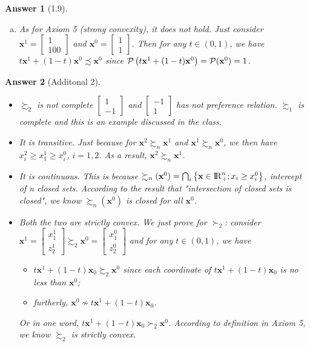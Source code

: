 \documentclass{article}
\newtheorem*{ans}{Answer}
\newcommand {\Reals}  {{\rm I \! R}}
\newcommand{\1}{{\bf 1}}
\newcommand{\0}{{\mathbf{0}}}
\newcommand{\x}{{\mathbf{x}}}
\newcommand{\cP}{{\cal P}}
\newcommand{\<}{\langle}
\renewcommand{\>}{\rangle}
\begin{document}
\begin{ans}[1.9]
\begin{enumerate}[(a)]
To conclude, Axiom 4 holds.
\item As for Axiom 5 (strong convexity), it does not hold. Just consider $\x^1 = \begin{bmatrix}
1 \\ 100
\end{bmatrix}$ and $\x^0 = \begin{bmatrix}
1 \\ 1
\end{bmatrix}$. Then for any $t \in (0,1)$, we have $t\x^1 + (1-t) \x^0 \precsim \x^0$ since  $\cP \left(t\x^1 + (1-t) \x^0\right)  = \cP (\x^0) = 1$.
\end{enumerate}
\end{ans}

\begin{ans}[Additonal 2]
\begin{itemize}\item 	$\succsim_2$ is not complete  $\begin{bmatrix}
	1 \\ -1 
	\end{bmatrix}$ and $\begin{bmatrix}
	-1 \\ 1 
	\end{bmatrix}$ has not preference relation. $\succsim_1$ is complete and this is an example discussed in the class.
	\item It is transitive. Just because for $\x^2 \succsim_n \x^1$ and $\x^1 \succsim_n \x^0$, we then have $x^2_i \ge x^1_1 \ge x^0_i$, $i=1,2$. As a result, $\x^2 \succsim_n \x^1$.
	\item It is continuous. This is because $\succsim_n (\x^0) = \bigcap_i \left\{\x\in \Reals_+^n; x_i \ge x_i^0 \right\} $, intercept of n closed sets. According to the result that "intersection of closed sets is closed", we know $\succsim_n (\x^0) $ is closed for all $\x^0$.
	\item Both the two are strictly convex. We just prove for $\succ_2$: consider $\x^1 =\begin{bmatrix}	x^1_1 \\ z^1_2	\end{bmatrix} \succsim_2 \x^0 = \begin{bmatrix}
	x^0_1 \\ z^0_2
	\end{bmatrix}$ and for any $t \in (0,1)$, we have 
	\begin{itemize}
		\item $t\x^1 + (1-t)\x_0 \succsim_2\x^0$ since each coordinate of $t\x^1 + (1-t)\x_0$ is no less than $\x^0$; 
		\item furtherly, $\x^0 \not\sim t\x^1 + (1-t)\x_0$.
	\end{itemize}
Or in one word, $t\x^1 + (1-t)\x_0 \succ_2\x^0$. According to definition in Axiom 5, we know $\succsim_2$ is strictly convex.
	\end{itemize}
\end{ans}
\end{document}
